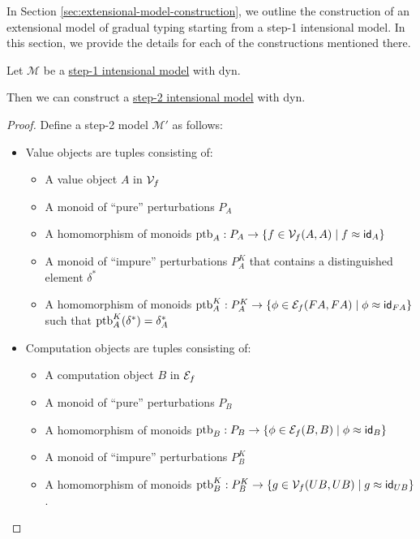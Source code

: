 In Section \ref{sec:extensional-model-construction}, we outline the construction
of an extensional model of gradual typing starting from a step-1 intensional model.
In this section, we provide the details for each of the constructions mentioned there.

\begin{lemma}\label{lem:step-1-model-to-step-2-model}
Let $\mathcal M$ be a \hyperref[def:step-1-model]{step-1 intensional model} with dyn.

Then we can construct a \hyperref[def:step-2-model]{step-2 intensional model} with dyn.
\end{lemma}
\begin{proof}

    Define a step-2 model $\mathcal M'$ as follows:
    \begin{itemize}
      \item Value objects are tuples consisting of:
      \begin{itemize}
        \item A value object $A$ in $\mathcal{V}_f$ 
        \item A monoid of ``pure'' perturbations $P_A$ 
        \item A homomorphism of monoids $\text{ptb}_A : P_A \to \{ f \in \mathcal{V}_f(A, A) \mid f \approx \mathsf{id}_A \}$
        \item A monoid of ``impure'' perturbations $P^K_A$ that contains a distinguished element $\delta^*$
        \item A homomorphism of monoids $\text{ptb}^K_A : P^K_A \to \{ \phi \in \mathcal{E}_f(FA, FA) \mid \phi \approx \mathsf{id}_{FA} \}$
        such that $\text{ptb}^K_A(\delta^*) = \delta_A^*$
      \end{itemize}  

      \item Computation objects are tuples consisting of:
      \begin{itemize}
        \item A computation object $B$ in $\mathcal{E}_f$
        \item A monoid of ``pure'' perturbations $P_B$
        \item A homomorphism of monoids $\text{ptb}_B : P_B \to \{ \phi \in \mathcal{E}_f(B, B) \mid \phi \approx \mathsf{id}_B \}$
        \item A monoid of ``impure'' perturbations $P^K_B$
        \item A homomorphism of monoids $\text{ptb}^K_B : P^K_B \to \{ g \in \mathcal{V}_f(UB, UB) \mid g \approx \mathsf{id}_{UB} \}$.
      \end{itemize}


\end{itemize}
\end{proof}
